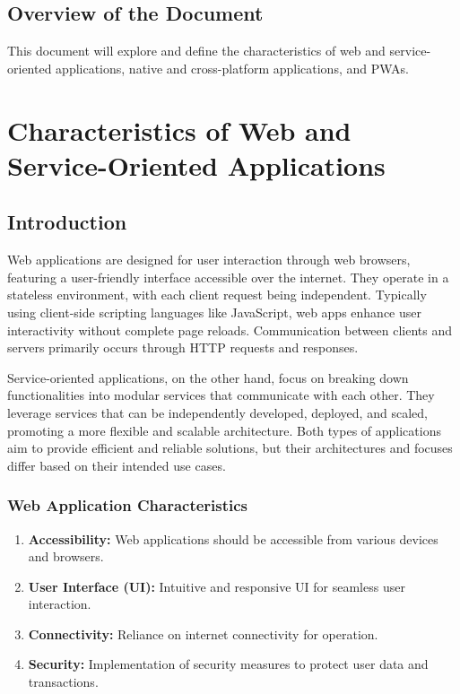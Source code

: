 \documentclass[12pt, a4paper, twoside]{article}
\begin{document}
\subsection{Overview of the Document}
\label{sec:overview}

This document will explore and define the characteristics of web and service-oriented applications, native and cross-platform applications, and PWAs.

\newpage

\section{Characteristics of Web and Service-Oriented Applications}
\label{sec:web-service-characteristics}

\subsection{Introduction}
\label{subsec:web-service-intro}

Web applications are designed for user interaction through web browsers, featuring a user-friendly interface accessible over the internet. They operate in a stateless environment, with each client request being independent. Typically using client-side scripting languages like JavaScript, web apps enhance user interactivity without complete page reloads. Communication between clients and servers primarily occurs through HTTP requests and responses.\vspace{1em}

Service-oriented applications, on the other hand, focus on breaking down functionalities into modular services that communicate with each other. They leverage services that can be independently developed, deployed, and scaled, promoting a more flexible and scalable architecture. Both types of applications aim to provide efficient and reliable solutions, but their architectures and focuses differ based on their intended use cases.

\subsubsection{Web Application Characteristics}
\label{subsubsec:web-app-characteristics}

\begin{enumerate}
  \item \textbf{Accessibility:} Web applications should be accessible from various devices and browsers.
  
  \item \textbf{User Interface (UI):} Intuitive and responsive UI for seamless user interaction.
  
  \item \textbf{Connectivity:} Reliance on internet connectivity for operation.
  
  \item \textbf{Security:} Implementation of security measures to protect user data and transactions.
\end{enumerate}
\end{document}
